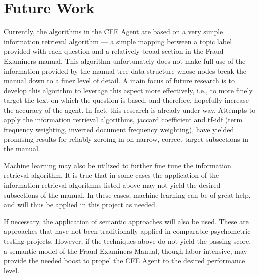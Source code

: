 \section{Future Work}
\label{sect:future_work}

Currently, the algorithms in the CFE Agent are based on a very simple information retrieval algorithm --- a simple mapping between a topic label provided with each question and a relatively broad section in the Fraud Examiners manual.  This algorithm unfortunately does not make full use of the information provided by the manual tree data structure whose nodes break the manual down to a finer level of detail.  A main focus of future research is to develop this algorithm to leverage this aspect more effectively, i.e., to more finely target the text on which the question is based, and therefore, hopefully increase the accuracy of the agent.  In fact, this research is already under way.  Attempts to apply the information retrieval algorithms, jaccard coefficient and tf-idf (term frequency weighting, inverted document frequency weighting), have yielded promising results for reliably zeroing in on narrow, correct target subsections in the manual.  

Machine learning may also be utilized to further fine tune the information retrieval algorithm.  It is true that in some cases the application of the information retrieval algorithms listed above may not yield the desired subsections of the manual.  In these cases, machine learning can be of great help, and will thus be applied in this project as needed.

If necessary, the application of semantic approaches will also be used.  These are approaches that have not been traditionally applied in comparable psychometric testing projects.  However, if the techniques above do not yield the passing score, a semantic model of the Fraud Examiners Manual, though labor-intensive, may provide the needed boost to propel the CFE Agent to the desired performance level.


